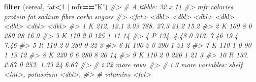\documentclass[
]{book}
\newenvironment{Shaded}{\begin{snugshade}}{\end{snugshade}}
\newcommand{\CommentTok}[1]{\textcolor[rgb]{0.56,0.35,0.01}{\textit{#1}}}
\newcommand{\DecValTok}[1]{\textcolor[rgb]{0.00,0.00,0.81}{#1}}
\newcommand{\FunctionTok}[1]{\textcolor[rgb]{0.13,0.29,0.53}{\textbf{#1}}}
\newcommand{\NormalTok}[1]{#1}
\newcommand{\SpecialCharTok}[1]{\textcolor[rgb]{0.81,0.36,0.00}{\textbf{#1}}}
\newcommand{\StringTok}[1]{\textcolor[rgb]{0.31,0.60,0.02}{#1}}
\begin{document}
\begin{Shaded}
\begin{Highlighting}[]
\FunctionTok{filter}\NormalTok{ (cereal, fat}\SpecialCharTok{\textless{}}\DecValTok{1} \SpecialCharTok{|}\NormalTok{ mfr}\SpecialCharTok{==}\StringTok{"K"}\NormalTok{)}
\CommentTok{\#\textgreater{} \# A tibble: 32 x 11}
\CommentTok{\#\textgreater{}    mfr   calories protein   fat sodium fibre carbo sugars}
\CommentTok{\#\textgreater{}    \textless{}fct\textgreater{}    \textless{}dbl\textgreater{}   \textless{}dbl\textgreater{} \textless{}dbl\textgreater{}  \textless{}dbl\textgreater{} \textless{}dbl\textgreater{} \textless{}dbl\textgreater{}  \textless{}dbl\textgreater{}}
\CommentTok{\#\textgreater{}  1 K         212.   12.1   3.03   788. 27.3   21.2  15.2 }
\CommentTok{\#\textgreater{}  2 K         100     8     0      280  28     16     0   }
\CommentTok{\#\textgreater{}  3 K         110     2     0      125   1     11    14   }
\CommentTok{\#\textgreater{}  4 P         134.    4.48  0      313.  7.46  19.4   7.46}
\CommentTok{\#\textgreater{}  5 R         110     2     0      280   0     22     3   }
\CommentTok{\#\textgreater{}  6 K         100     2     0      290   1     21     2   }
\CommentTok{\#\textgreater{}  7 K         110     1     0       90   1     13    12   }
\CommentTok{\#\textgreater{}  8 K         220     6     6      280   8     20    14   }
\CommentTok{\#\textgreater{}  9 K         110     2     0      220   1     21     3   }
\CommentTok{\#\textgreater{} 10 R         133.    2.67  0      253.  1.33  24     6.67}
\CommentTok{\#\textgreater{} \# i 22 more rows}
\CommentTok{\#\textgreater{} \# i 3 more variables: shelf \textless{}int\textgreater{}, potassium \textless{}dbl\textgreater{},}
\CommentTok{\#\textgreater{} \#   vitamins \textless{}fct\textgreater{}}


\end{Highlighting}
\end{Shaded}
\end{document}
